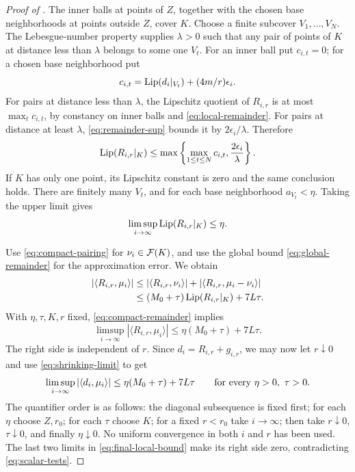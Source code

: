 \begin{proof}[Proof of ]
The inner balls at points of \(Z\), together with the chosen base
neighborhoods at points outside \(Z\), cover \(K\). Choose a finite
subcover \(V_1,\ldots,V_N\). The Lebesgue-number property supplies
\(\lambda>0\) such that any pair of points of \(K\) at distance less
than \(\lambda\) belongs to some one \(V_t\).
For an inner ball put \(c_{i,t}=0\); for a chosen base neighborhood
put
\[
 c_{i,t}=\operatorname{Lip}(d_i|_{V_t})+(4m/r)\epsilon_i.
\]
For pairs at distance less than \(\lambda\), the Lipschitz quotient
of \(R_{i,r}\) is at most \(\max_t c_{i,t}\), by constancy on inner
balls and \eqref{eq:local-remainder}. For pairs at distance at least
\(\lambda\), \eqref{eq:remainder-sup} bounds it by
\(2\epsilon_i/\lambda\). Therefore
\[
 \operatorname{Lip}(R_{i,r}|_K)
 \le\max\left\{\max_{1\le t\le N}c_{i,t},
                       \frac{2\epsilon_i}{\lambda}\right\}.
\]
If \(K\) has only one point, its Lipschitz constant is zero and the
same conclusion holds. There are finitely many \(V_t\), and for
each base neighborhood \(a_{V_t}<\eta\). Taking the upper limit gives
\begin{equation}
\label{eq:compact-remainder}
 \limsup_{i\to\infty}\operatorname{Lip}(R_{i,r}|_K)\le\eta.
\end{equation}

Use \eqref{eq:compact-pairing} for \(\nu_i\in\mathcal F(K)\), and use the
global bound \eqref{eq:global-remainder} for the approximation error.
We obtain
\begin{align*}
 |\langle R_{i,r},\mu_i\rangle|
 &\le |\langle R_{i,r},\nu_i\rangle|
       +|\langle R_{i,r},\mu_i-\nu_i\rangle|\\
 &\le (M_0+\tau)\operatorname{Lip}(R_{i,r}|_K)+7L\tau.
\end{align*}
With \(\eta,\tau,K,r\) fixed, \eqref{eq:compact-remainder} implies
\[
 \limsup_{i\to\infty}|\langle R_{i,r},\mu_i\rangle|
 \le \eta(M_0+\tau)+7L\tau.
\]
The right side is independent of \(r\). Since
\(d_i=R_{i,r}+g_{i,r}\), we may now let \(r\downarrow0\) and use
\eqref{eq:shrinking-limit} to get
\begin{equation}
\label{eq:final-local-bound}
 \limsup_{i\to\infty}|\langle d_i,\mu_i\rangle|
 \le \eta(M_0+\tau)+7L\tau
 \qquad\hbox{for every }\eta>0,\ \tau>0.
\end{equation}
The quantifier order is as follows: the diagonal subsequence is fixed
first; for each \(\eta\) choose \(Z,r_0\); for each \(\tau\) choose
\(K\); for a fixed \(r<r_0\) take \(i\to\infty\); then take
\(r\downarrow0\), \(\tau\downarrow0\), and finally
\(\eta\downarrow0\). No uniform convergence in both \(i\) and \(r\)
has been used. The last two limits in \eqref{eq:final-local-bound}
make its right side zero, contradicting \eqref{eq:scalar-tests}.
\end{proof}
